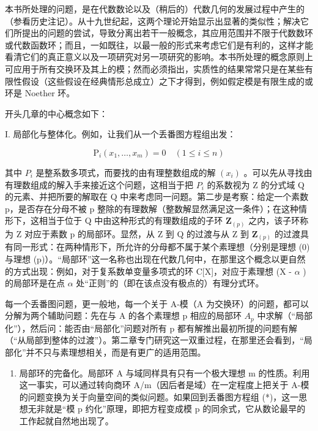 
本书所处理的问题，是在代数数论以及（稍后的）代数几何的发展过程中产生的（参看历史注记）。从十九世纪起，这两个理论开始显示出显著的类似性；解决它们所提出的问题的尝试，导致分离出若干一般概念，其应用范围并不限于代数数环或代数函数环；而且，一如既往，以最一般的形式来考虑它们是有利的，这样才能看清它们的真正意义以及一项研究对另一项研究的影响。本书所处理的概念原则上可应用于所有交换环及其上的模；然而必须指出，实质性的结果常常只是在某些有限性假设（这些假设在经典情形总成立）之下才得到，例如假定模是有限生成的或环是 Noether 环。

开头几章的中心概念如下：

I. 局部化与整体化。例如，让我们从一个丢番图方程组出发：

\[
\mathrm{P} _ {i} (x _ {1}, \dots , x _ {m}) = 0 \quad (1 \leqslant i \leqslant n)\tag{*}
\]

其中 \(P_{i}\) 是整系数多项式，而要找的由有理整数组成的解 \((x_{i})\) 。可以先从寻找由有理数组成的解入手来接近这个问题，这相当于把 \(P_{i}\) 的系数视为 Z 的分式域 Q 的元素、并把所要的解取在 Q 中来考虑同一问题。第二步是考察：给定一个素数 p，是否存在分母不被 p 整除的有理数解（整数解显然满足这一条件）；在这种情形下，这相当于位于 Q 中由这种形式的有理数组成的子环 \(\mathbf{Z}_{(p)}\) 之内，该子环称为 Z 对应于素数 p 的局部环。显然，从 Z 到 Q 的过渡与从 Z 到 \(\mathbf{Z}_{(p)}\) 的过渡具有同一形式：在两种情形下，所允许的分母都不属于某个素理想（分别是理想 (0) 与理想 (p)）。“局部环”这一名称也出现在代数几何中，在那里这个概念以更自然的方式出现：例如，对于复系数单变量多项式的环 C{[}X{]}，对应于素理想 (X - \(\alpha\) ) 的局部环是在点 \(\alpha\) 处“正则”的（即在该点没有极点的）有理分式环。

每一个丢番图问题，更一般地，每一个关于 A-模（A 为交换环）的问题，都可以分解为两个辅助问题：先在与 A 的各个素理想 p 相应的局部环 \(A_{p}\) 中求解（“局部化”），然后问：能否由“局部化”问题对所有 p 都有解推出最初所提的问题有解（“从局部到整体的过渡”）。第二章专门研究这一双重过程，在那里还会看到，“局部化”并不只与素理想相关，而是有更广的适用范围。

\begin{enumerate}
\def\labelenumi{\Roman{enumi}.}
\setcounter{enumi}{1}
\tightlist
\item
  局部环的完备化。局部环 A 与域同样具有只有一个极大理想 m 的性质。利用这一事实，可以通过转向商环 A/m（因后者是域）在一定程度上把关于 A-模的问题变换为关于向量空间的类似问题。如果回到丢番图方程组 (*)，这一思想无非就是“模 p 约化”原理，即把方程变成模 p 的同余式，它从数论最早的工作起就自然地出现了。
\end{enumerate}

